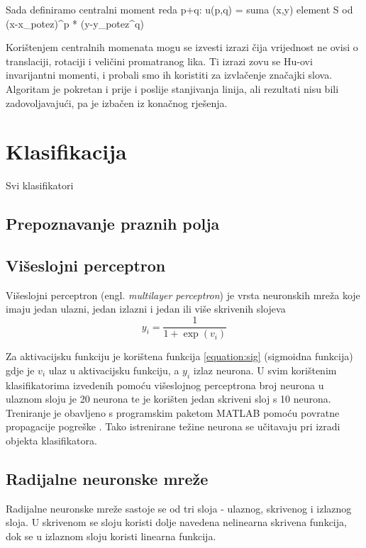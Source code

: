\documentclass[a4paper,twocolumn,dvipdfm]{article}
\begin{document}
Sada definiramo centralni moment reda p+q:
u(p,q) = suma (x,y) element S od (x-x_potez)^p * (y-y_potez^q)

Korištenjem centralnih momenata mogu se izvesti izrazi čija vrijednost ne ovisi o translaciji, rotaciji i veličini promatranog lika.
Ti izrazi zovu se Hu-ovi invarijantni momenti, i probali smo ih koristiti za izvlačenje značajki slova.
Algoritam je pokretan i prije i poslije stanjivanja linija, ali rezultati nisu bili zadovoljavajući, pa je izbačen iz konačnog rješenja.


\section{Klasifikacija}
Svi klasifikatori 

\subsection{Prepoznavanje praznih polja}

\subsection{Višeslojni perceptron}
Višeslojni perceptron \cite{rosenblatt1958perceptron} (engl. \emph{multilayer
perceptron}) je vrsta neuronskih mreža koje imaju jedan ulazni, jedan izlazni i
jedan ili više skrivenih slojeva
\begin{equation}
y_i = \frac{1}{1 + \exp(v_i)}
\label{equation:sig}
\end{equation}

Za aktivacijsku funkciju je korištena funkcija \ref{equation:sig} (sigmoidna
funkcija) gdje je $v_i$ ulaz u aktivacijsku funkciju, a $y_i$ izlaz neurona. U
svim korištenim klasifikatorima izvedenih pomoću višeslojnog perceptrona broj
neurona u ulaznom sloju je 20 neurona te je korišten jedan skriveni sloj s 10
neurona. Treniranje je obavljeno s programskim paketom MATLAB pomoću povratne
propagacije pogreške \cite{rumelhart1986learning}. Tako istrenirane težine
neurona se učitavaju pri izradi objekta klasifikatora.

\subsection{Radijalne neuronske mreže}
Radijalne neuronske mreže sastoje se od tri sloja - ulaznog, skrivenog i
izlaznog sloja. U skrivenom se sloju koristi dolje navedena nelinearna skrivena
funkcija, dok se u izlaznom sloju koristi linearna funkcija.
\end{document}
